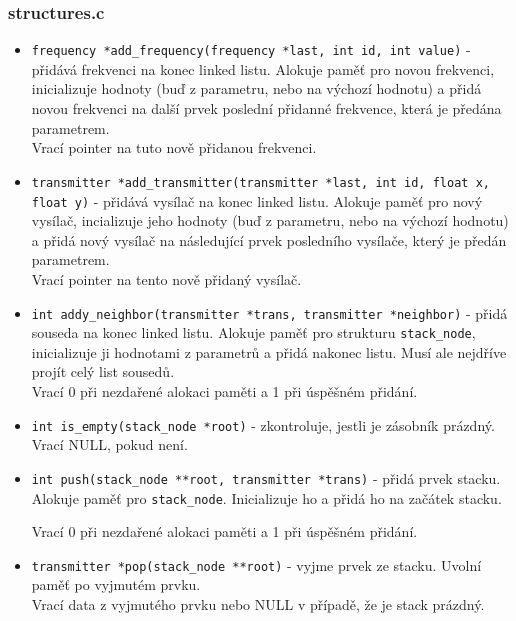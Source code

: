 \documentclass[12pt]{article}
\begin{document}
\subsubsection{structures.c}
%
\begin{itemize}
	\item \texttt{frequency *add\_frequency(frequency *last, int id,
		int value)} - přidává frekvenci na konec linked listu. Alokuje
		paměť pro novou frekvenci, inicializuje hodnoty (buď z
		parametru, nebo na výchozí hodnotu) a přidá novou
		frekvenci na další prvek poslední přidanné frekvence, která je
		předána parametrem.\\

		Vrací pointer na tuto nově přidanou frekvenci.
	\item \texttt{transmitter *add\_transmitter(transmitter *last, int id,
		float x, float y)} - přidává vysílač na konec linked listu.
		Alokuje paměť pro nový vysílač, incializuje jeho hodnoty (buď 
		z parametru, nebo na výchozí hodnotu) a přidá nový vysílač na
		následující prvek posledního vysílače, který je předán
		parametrem.\\

		Vrací pointer na tento nově přidaný vysílač.
	\item \texttt{int addy\_neighbor(transmitter *trans,
		transmitter *neighbor)} - přidá souseda na konec linked listu.
		Alokuje paměť pro strukturu \texttt{stack\_node}, inicializuje
		ji hodnotami z parametrů a přidá nakonec listu. Musí ale 
		nejdříve projít celý list sousedů.\\

		Vrací 0 při nezdařené alokaci paměti a 1 při úspěšném přidání.
	\item \texttt{int is\_empty(stack\_node *root)} - zkontroluje, jestli
		je zásobník prázdný.\\

		Vrací NULL, pokud není.
	\item \texttt{int push(stack\_node **root, transmitter *trans)} - přidá
		prvek stacku. Alokuje paměť pro \texttt{stack\_node}. 
		Inicializuje ho a přidá ho na začátek stacku.

		Vrací 0 při nezdařené alokaci paměti a 1 při úspěšném přidání.
	\item \texttt{transmitter *pop(stack\_node **root)} - vyjme prvek ze 
		stacku. Uvolní paměť po vyjmutém prvku.\\

		Vrací data z vyjmutého prvku nebo NULL v případě, že je stack
		prázdný.
\end{itemize}
%
\end{document}
